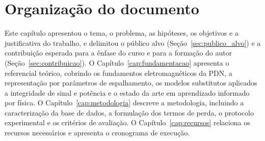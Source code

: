 \section{Organização do documento}
\label{sec:organizacao}

Este capítulo apresentou o tema, o problema, as hipóteses, os objetivos e a
justificativa do trabalho, e delimitou o público alvo
(Seção~\ref{sec:publico_alvo}) e a contribuição esperada para a ênfase do curso
e para a formação do autor (Seção~\ref{sec:contribuicao}). O
Capítulo~\ref{cap:fundamentacao} apresenta o referencial teórico, cobrindo os
fundamentos eletromagnéticos da PDN, a representação por parâmetros de
espalhamento, os modelos substitutos aplicados a integridade de sinal e potência
e o estado da arte em aprendizado informado por física. O
Capítulo~\ref{cap:metodologia} descreve a metodologia, incluindo a caracterização
da base de dados, a formulação dos termos de perda, o protocolo experimental e os
critérios de avaliação. O Capítulo~\ref{cap:recursos} relaciona os recursos
necessários e apresenta o cronograma de execução.
